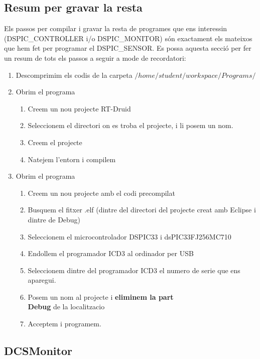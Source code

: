 \subsection{Resum per gravar la resta}\label{cap:gui:cd:comp:save:all}

Els passos per compilar i gravar la resta de programes que ens interessin (DSPIC\_CONTROLLER i/o DSPIC\_MONITOR) són exactament els mateixos que hem fet per programar el DSPIC\_SENSOR.
Es possa aquesta secció per fer un resum de tots els passos a seguir a mode de recordatori:

\begin{enumerate}
	\item Descomprimim els codis de la carpeta $/home/student/workspace/Programs/$
	\item Obrim el programa \Eclipse
	\begin{enumerate}
		\item Creem un nou projecte RT-Druid
		\item Seleccionem el directori on es troba el projecte, i li posem un nom.
		\item Creem el projecte
		\item Natejem l'entorn i compilem
	\end{enumerate}
	\item Obrim el programa \MplabX
	\begin{enumerate}
		\item Creem un nou projecte amb el codi precompilat
		\item Busquem el fitxer .elf (dintre del directori del projecte creat amb Eclipse i dintre de Debug)
		\item Seleccionem el microcontrolador DSPIC33 i dsPIC33FJ256MC710
		\item Endollem el programador ICD3 al ordinador per USB
		\item Seleccionem dintre del programador ICD3 el numero de serie que ens aparegui.
		\item Posem un nom al projecte i \textbf{eliminem la part \\Debug} de la localitzacio
		\item Acceptem i programem.
	\end{enumerate}
\end{enumerate}

\subsection{DCSMonitor}\label{cap:gui:cd:dcsmonitor}

